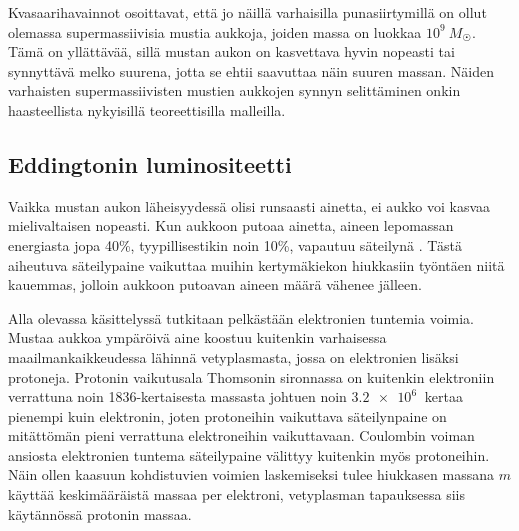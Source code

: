 \documentclass[12pt,a4paper]{article}
\begin{document}
Kvasaarihavainnot osoittavat, että jo näillä varhaisilla punasiirtymillä on ollut olemassa supermassiivisia mustia aukkoja, joiden massa on luokkaa $10^9 ~M_{\astrosun}$. Tämä on yllättävää, sillä mustan aukon on kasvettava hyvin nopeasti tai synnyttävä melko suurena, jotta se ehtii saavuttaa näin suuren massan. Näiden varhaisten supermassiivisten mustien aukkojen synnyn selittäminen onkin haasteellista nykyisillä teoreettisilla malleilla. \cite{li}

\subsection{Eddingtonin luminositeetti}
Vaikka mustan aukon läheisyydessä olisi runsaasti ainetta, ei aukko voi kasvaa mielivaltaisen nopeasti. Kun aukkoon putoaa ainetta, aineen lepomassan energiasta jopa 40\%, tyypillisestikin noin 10\%, vapautuu säteilynä \cite{pringle}. Tästä aiheutuva säteilypaine vaikuttaa muihin kertymäkiekon hiukkasiin työntäen niitä kauemmas, jolloin aukkoon putoavan aineen määrä vähenee jälleen. \cite{bartelmann}

Alla olevassa käsittelyssä tutkitaan pelkästään elektronien tuntemia voimia. Mustaa aukkoa ympäröivä aine koostuu kuitenkin varhaisessa maailmankaikkeudessa lähinnä vetyplasmasta, jossa on elektronien lisäksi protoneja. Protonin vaikutusala Thomsonin sironnassa on kuitenkin elektroniin verrattuna noin 1836-kertaisesta massasta johtuen noin $\SI{3,2e6}{}$ kertaa pienempi kuin elektronin, joten protoneihin vaikuttava säteilynpaine on mitättömän pieni verrattuna elektroneihin vaikuttavaan. Coulombin voiman ansiosta elektronien tuntema säteilypaine välittyy kuitenkin myös protoneihin. Näin ollen kaasuun kohdistuvien voimien laskemiseksi tulee hiukkasen massana $m$ käyttää keskimääräistä massaa per elektroni, vetyplasman tapauksessa siis käytännössä protonin massaa. \cite{pringle}
\end{document}
